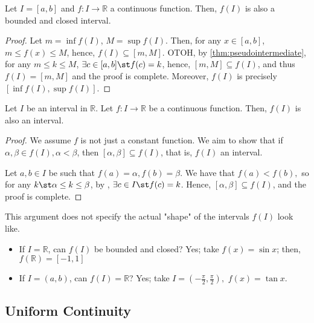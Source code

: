 \documentclass[12pt]{article}
\begin{document}
\begin{theorem}
  Let $I = [a, b]$ and $f: I \to \mathbb{R}$ a continuous function. Then, $f(I)$ is also a bounded and closed interval.
\end{theorem}

\begin{proof}
  Let $m = \inf f(I)$, $M = \sup f(I)$. Then, for any $x \in [a, b]$, $m \leq f(x) \leq M$, hence, $f(I) \subseteq [m , M]$. OTOH, by \cref{thm:pseudointermediate}, for any $m \leq k \leq M$, $\exists c \in [a, b] \st f(c) = k$, hence, $[m, M] \subseteq f(I)$, and thus $f(I) = [m,M]$ and the proof is complete. Moreover, $f(I)$ is precisely $[\inf f(I), \sup f(I)]$.
\end{proof}

\begin{theorem}
  Let $I$ be an interval in $\mathbb{R}$. Let $f : I \to \mathbb{R}$ be a continuous function. Then, $f(I)$ is also an interval. 
\end{theorem}

\begin{proof}
  We assume $f$ is not just a constant function. We aim to show that if $\alpha, \beta \in f(I), \alpha < \beta$, then $[\alpha, \beta] \subseteq f(I)$, that is, $f(I)$ an interval. 
  
  Let $a,b \in I$ be such that $f(a) = \alpha, f(b) = \beta$. We have that $f(a) < f(b),$ so for any $k \st \alpha \leq k \leq \beta$, by , $\exists c \in I \st f(c) = k$. Hence, $[\alpha, \beta] \subseteq f(I)$, and the proof is complete.
\end{proof}

\begin{remark}
  This argument does not specify the actual "shape" of the intervals $f(I)$ look like. 
  \begin{itemize}
    \item If $I = \mathbb{R}$, can $f(I)$ be bounded and closed? Yes; take $f(x) = \sin x$; then, $f(\mathbb{R}) = [-1, 1]$
    \item If $I = (a, b)$, can $f(I) = \mathbb{R}$? Yes; take $I = (-\frac{\pi}{2}, \frac{\pi}{2}),$ $f(x) = \tan x$.
  \end{itemize}
\end{remark}

\subsection{Uniform Continuity}
\end{document}
